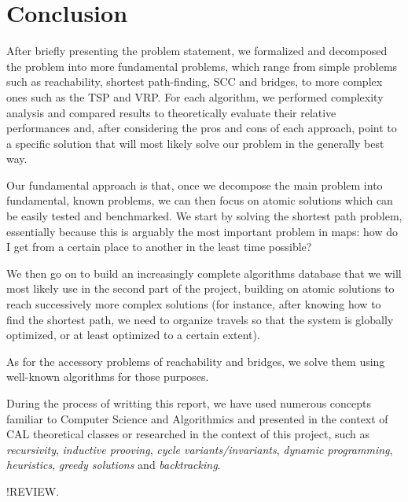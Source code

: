 \chapter{Conclusion} \label{conclusion}
After briefly presenting the problem statement, we formalized and decomposed the problem into more fundamental problems, which range from simple problems such as reachability, shortest path-finding, \acrshort{SCC} and bridges, to more complex ones such as the \acrshort{TSP} and \acrshort{VRP}. For each algorithm, we performed complexity analysis and compared results to theoretically evaluate their relative performances and, after considering the pros and cons of each approach, point to a specific solution that will most likely solve our problem in the generally best way.\par
Our fundamental approach is that, once we decompose the main problem into fundamental, known problems, we can then focus on atomic solutions which can be easily tested and benchmarked. We start by solving the shortest path problem, essentially because this is arguably the most important problem in maps: how do I get from a certain place to another in the least time possible?\par
We then go on to build an increasingly complete algorithms database that we will most likely use in the second part of the project, building on atomic solutions to reach successively more complex solutions (for instance, after knowing how to find the shortest path, we need to organize travels so that the system is globally optimized, or at least optimized to a certain extent).\par
As for the accessory problems of reachability and bridges, we solve them using well-known algorithms for those purposes.\par
During the process of writting this report, we have used numerous concepts familiar to Computer Science and Algorithmics and presented in the context of CAL theoretical classes or researched in the context of this project, such as \emph{recursivity}, \emph{inductive prooving}, \emph{cycle variants/invariants}, \emph{dynamic programming}, \emph{heuristics}, \emph{greedy solutions} and \emph{backtracking}.\par
!REVIEW.
